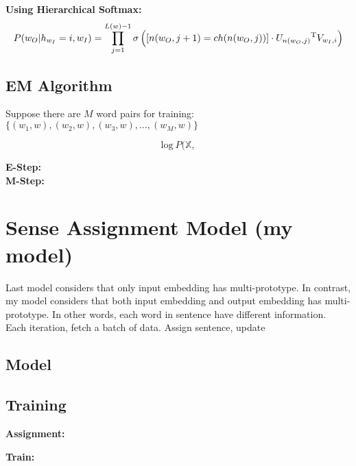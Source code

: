 \textbf{Using Hierarchical Softmax:}\\
$$P(w_O|h_{w_I}=i,w_I) = \prod_{j=1}^{L(w)-1}\sigma\left(\left[n(w_O,j+1)=ch(n(w_O,j))\right]\cdot {U_{n(w_O,j)}}^{\rm T}V_{w_I,i}\right)$$ 

\subsection{EM Algorithm}

Suppose there are $M$ word pairs for training: $\{(w_1,w),(w_2,w),(w_3,w),\ldots,(w_M,w)\}$

$$\mathrm{log}\ P(\mathbb{X},$$

\textbf{E-Step:}\\

\textbf{M-Step:}\\


\section{Sense Assignment Model (my model)}

Last model considers that only input embedding has multi-prototype. In contrast, my model considers that both input embedding and output embedding has multi-prototype. In other words, each word in sentence have different information. \\

Each iteration, fetch a batch of data. Assign sentence, update 

\subsection{Model}

\subsection{Training}

\textbf{Assignment:}\\



\textbf{}

\textbf{Train:}\\
